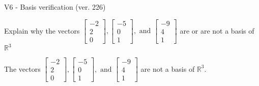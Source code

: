 \begin{exercise}
  \begin{exerciseTitle}V6 - Basis verification (ver. 226)\end{exerciseTitle}
  \begin{exerciseStatement}
    Explain why the vectors \(\left[\begin{array}{r}
-2 \\
2 \\
0
\end{array}\right] , \left[\begin{array}{r}
-5 \\
0 \\
1
\end{array}\right] , \text{ and } \left[\begin{array}{r}
-9 \\
4 \\
1
\end{array}\right]\) are or are not a basis of \(\mathbb{R}^3\)	


  \end{exerciseStatement}
  \begin{exerciseAnswer}
   The vectors \(\left[\begin{array}{r}
-2 \\
2 \\
0
\end{array}\right] , \left[\begin{array}{r}
-5 \\
0 \\
1
\end{array}\right] , \text{ and } \left[\begin{array}{r}
-9 \\
4 \\
1
\end{array}\right]\) 
  	 are not  a basis of \(\mathbb{R}^3\).
  


  \end{exerciseAnswer}
\end{exercise}